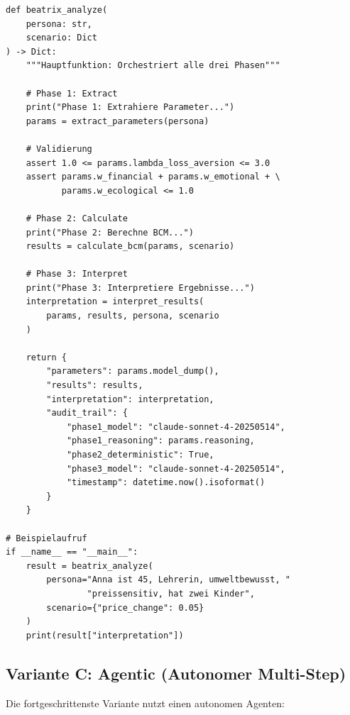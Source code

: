 \documentclass[12pt,a4paper]{article}
\begin{document}
\begin{lstlisting}[caption={BEATRIX Orchestrator: Integration der drei Phasen}]
def beatrix_analyze(
    persona: str,
    scenario: Dict
) -> Dict:
    """Hauptfunktion: Orchestriert alle drei Phasen"""

    # Phase 1: Extract
    print("Phase 1: Extrahiere Parameter...")
    params = extract_parameters(persona)

    # Validierung
    assert 1.0 <= params.lambda_loss_aversion <= 3.0
    assert params.w_financial + params.w_emotional + \
           params.w_ecological <= 1.0

    # Phase 2: Calculate
    print("Phase 2: Berechne BCM...")
    results = calculate_bcm(params, scenario)

    # Phase 3: Interpret
    print("Phase 3: Interpretiere Ergebnisse...")
    interpretation = interpret_results(
        params, results, persona, scenario
    )

    return {
        "parameters": params.model_dump(),
        "results": results,
        "interpretation": interpretation,
        "audit_trail": {
            "phase1_model": "claude-sonnet-4-20250514",
            "phase1_reasoning": params.reasoning,
            "phase2_deterministic": True,
            "phase3_model": "claude-sonnet-4-20250514",
            "timestamp": datetime.now().isoformat()
        }
    }

# Beispielaufruf
if __name__ == "__main__":
    result = beatrix_analyze(
        persona="Anna ist 45, Lehrerin, umweltbewusst, "
                "preissensitiv, hat zwei Kinder",
        scenario={"price_change": 0.05}
    )
    print(result["interpretation"])
\end{lstlisting}

\subsection{Variante C: Agentic (Autonomer Multi-Step)}

Die fortgeschrittenste Variante nutzt einen autonomen Agenten:
\end{document}

